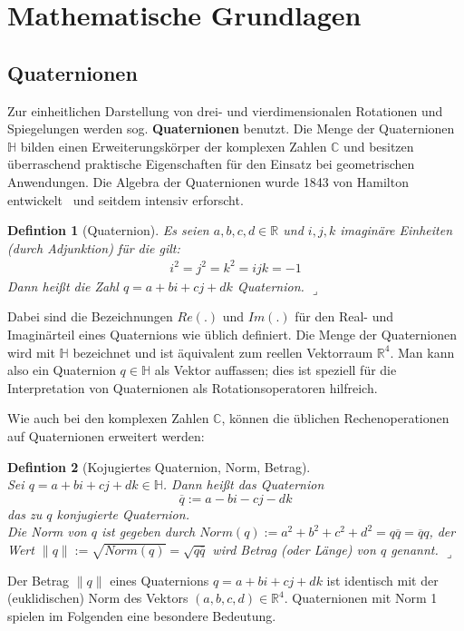 \newtheorem{defdef}{Defintion}[section]
\newenvironment{definition}[1][]{\begin{defdef}[#1] \normalfont\hspace*{1mm}}{\hfill $\lrcorner$\end{defdef}\vspace{0.2cm}}

\section{Mathematische Grundlagen}
\subsection{Quaternionen}\label{quaternionen}
Zur einheitlichen Darstellung von drei- und vierdimensionalen Rotationen und Spiegelungen werden
sog. \textbf{Quaternionen} benutzt.
Die Menge der Quaternionen $\mathbb{H}$ bilden einen Erweiterungskörper der komplexen Zahlen $\mathbb{C}$ und besitzen überraschend praktische Eigenschaften für den Einsatz bei geometrischen Anwendungen. Die Algebra der Quaternionen wurde 1843 von Hamilton entwickelt~\cite{hazewinkel2004algebras} und seitdem intensiv erforscht.

\begin{definition}[Quaternion]
Es seien $a,b,c,d \in \mathbb{R}$ und $i,j,k$ imaginäre Einheiten (durch Adjunktion) für die gilt:
\begin{equation*}\begin{split}
i^2 = j^2 = k^2 = ijk = -1
\end{split}\end{equation*}
Dann heißt die Zahl $q = a + bi + cj + dk$ Quaternion.
\end{definition}
Dabei sind die Bezeichnungen $Re(.)$ und $Im(.)$ für den Real- und Imaginärteil eines Quaternions wie üblich definiert.
Die Menge der Quaternionen wird mit $\mathbb{H}$ bezeichnet und ist äquivalent zum reellen Vektorraum $\mathbb{R}^4$.
Man kann also ein Quaternion $q \in \mathbb{H}$ als Vektor auffassen; dies ist speziell für die Interpretation von Quaternionen als Rotationsoperatoren hilfreich.

Wie auch bei den komplexen Zahlen $\mathbb{C}$, können die üblichen Rechenoperationen auf Quaternionen erweitert werden:

\begin{definition}[Kojugiertes Quaternion, Norm, Betrag] $\quad$ \\
Sei $q = a + bi + cj + dk \in \mathbb{H}$. Dann heißt das Quaternion
\begin{equation*}
\overline{q} := a - bi - cj - dk
\end{equation*} das zu $q$ konjugierte Quaternion. \\
Die Norm von $q$ ist gegeben durch $Norm(q) := a^2 + b^2 + c^2 + d^2 = q\overline{q} = \overline{q}q$, der Wert
$\| q \| := \sqrt{Norm(q)} = \sqrt{q \overline{q}}$ wird Betrag (oder Länge) von $q$ genannt.
\end{definition}
\noindent Der Betrag $\|q\|$ eines Quaternions $q = a + bi + cj + dk$ ist identisch mit der (euklidischen) Norm des Vektors $(a,b,c,d) \in \mathbb{R}^4$. Quaternionen mit Norm 1 spielen im Folgenden eine besondere Bedeutung.


